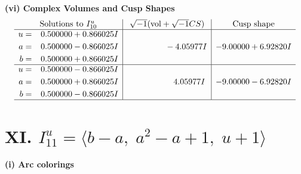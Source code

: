 \documentclass[1p]{elsarticle_modified}
\theoremstyle{definition}
\newcommand{\I}{\sqrt{-1}}
\begin{document}
\newpage\flushleft \textbf{(vi) Complex Volumes and Cusp Shapes}
$$\begin{array}{c|c|c}  
\text{Solutions to }I^u_{10}& \I (\text{vol} + \sqrt{-1}CS) & \text{Cusp shape}\\
 \hline 
\begin{aligned}
u &= \phantom{-}0.500000 + 0.866025 I \\
a &= \phantom{-}0.500000 - 0.866025 I \\
b &= \phantom{-}0.500000 + 0.866025 I\end{aligned}
 & \phantom{-0.000000 } -4.05977 I & -9.00000 + 6.92820 I \\ \hline\begin{aligned}
u &= \phantom{-}0.500000 - 0.866025 I \\
a &= \phantom{-}0.500000 + 0.866025 I \\
b &= \phantom{-}0.500000 - 0.866025 I\end{aligned}
 & \phantom{-0.000000 -}4.05977 I & -9.00000 - 6.92820 I\\
 \hline 
 \end{array}$$\newpage\newpage\renewcommand{\arraystretch}{1}
\centering \section*{XI. $I^u_{11}= \langle b- a,\;a^2- a+1,\;u+1 \rangle$}
\flushleft \textbf{(i) Arc colorings}\\
\end{document}
